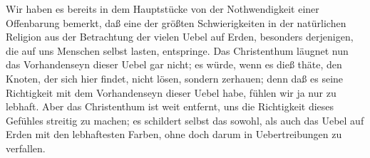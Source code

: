 Wir haben es bereits in dem Hauptstücke von der Nothwendigkeit einer Offenbarung bemerkt, daß eine der größten Schwierigkeiten in der natürlichen Religion aus der Betrachtung der vielen Uebel auf Erden, besonders derjenigen, die auf uns Menschen selbst lasten, entspringe. Das Christenthum läugnet nun das Vorhandenseyn dieser Uebel gar nicht; es würde, wenn es dieß thäte, den Knoten, der sich hier findet, nicht lösen, sondern zerhauen; denn daß es seine Richtigkeit mit dem Vorhandenseyn dieser Uebel habe, fühlen wir ja nur zu lebhaft. Aber das Christenthum ist weit entfernt, uns die Richtigkeit dieses Gefühles streitig zu machen; es schildert selbst das  sowohl, als auch das  Uebel auf Erden mit den lebhaftesten Farben, ohne doch darum in Uebertreibungen zu verfallen.
